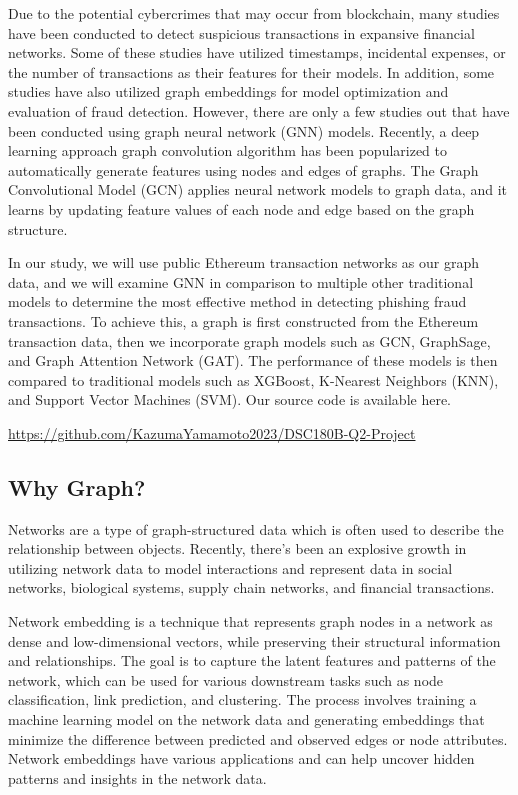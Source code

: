\documentclass{article}
\begin{document}
	Due to the potential cybercrimes that may occur from blockchain, many studies have been conducted to detect suspicious transactions in expansive financial networks. Some of these studies have utilized timestamps, incidental expenses, or the number of transactions as their features for their models. In addition, some studies have also utilized graph embeddings for model optimization and evaluation of fraud detection. However, there are only a few studies out that have been conducted using graph neural network (GNN) models. Recently, a deep learning approach graph convolution algorithm has been popularized to automatically generate features using nodes and edges of graphs. The Graph Convolutional Model (GCN) applies neural network models to graph data, and it learns by updating feature values of each node and edge based on the graph structure. 

    In our study, we will use public Ethereum transaction networks as our graph data, and we will examine GNN in comparison to multiple other traditional models to determine the most effective method in detecting phishing fraud transactions. To achieve this, a graph is first constructed from the Ethereum transaction data, then we incorporate graph models such as GCN, GraphSage, and Graph Attention Network (GAT). The performance of these models is then compared to traditional models such as XGBoost, K-Nearest Neighbors (KNN), and Support Vector Machines (SVM). Our source code is available here. 

\begin{center}
\url{https://github.com/KazumaYamamoto2023/DSC180B-Q2-Project}
\end{center}

\subsection{Why Graph?}
Networks are a type of graph-structured data which is often used to describe the relationship between objects. Recently, there’s been an explosive growth in utilizing network data to model interactions and represent data in social networks, biological systems, supply chain networks, and financial transactions.

Network embedding is a technique that represents graph nodes in a network as dense and low-dimensional vectors, while preserving their structural information and relationships. The goal is to capture the latent features and patterns of the network, which can be used for various downstream tasks such as node classification, link prediction, and clustering. The process involves training a machine learning model on the network data and generating embeddings that minimize the difference between predicted and observed edges or node attributes. Network embeddings have various applications and can help uncover hidden patterns and insights in the network data.
\end{document}
